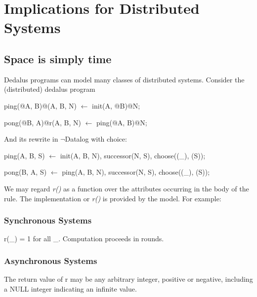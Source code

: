 \section{Implications for Distributed Systems}

\subsection{Space is simply time}

Dedalus programs can model many classes of distributed systems.  Consider the (distributed) dedalus program

\begin{Dedalus}
ping(@A, B)@(A, B, N) \(\leftarrow\)
  init(A, @B)@N; 

pong(@B, A)@r(A, B, N) \(\leftarrow\)
  ping(@A, B)@N;
\end{Dedalus}

And its rewrite in $\lnot$Datalog with choice:

\begin{Dedalus}
ping(A, B, S) \(\leftarrow\)
  init(A, B, N),
  successor(N, S),
  choose((_), (S));

pong(B, A, S) \(\leftarrow\)
  ping(A, B, N),
  successor(N, S),
  choose((_), (S));
  
\end{Dedalus}

We may regard  \emph{r()} as a function over the attributes occurring in the body of the rule.   The implementation or \emph{r()} is provided by
the model.  For example:

\subsubsection{Synchronous Systems}

r(\_) = 1 for all \_.  Computation proceeds in rounds.

\subsubsection{Asynchronous Systems}

The return value of r may be any arbitrary integer, positive or negative, including a NULL integer indicating an infinite value.


